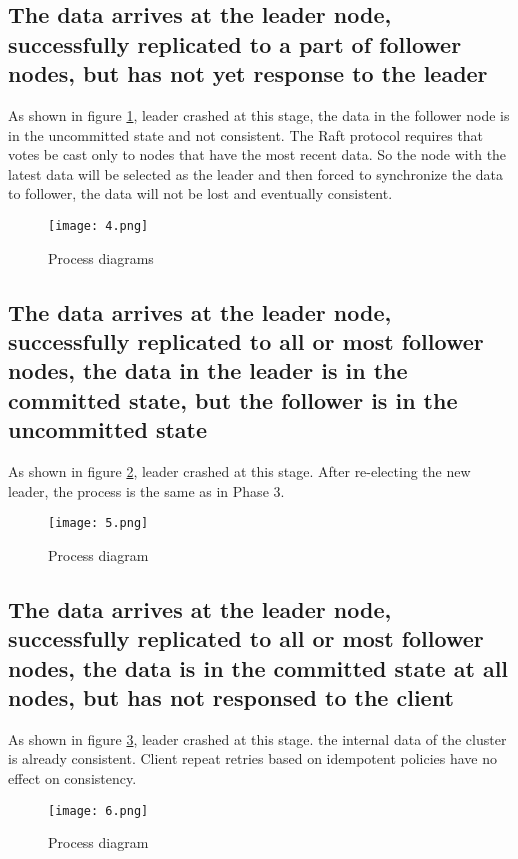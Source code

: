 \documentclass{report}
\begin{document}
\subsection{The data arrives at the leader node, successfully replicated to a part of follower nodes, but has not yet response to the leader}
As shown in figure \ref{fig:4}, leader crashed at this stage, the data in the follower node is in the uncommitted state and not consistent. The Raft protocol requires that votes be cast only to nodes that have the most recent data. So the node with the latest data will be selected as the leader and then forced to synchronize the data to follower, the data will not be lost and eventually consistent.
\begin{figure}[H]
    \centering
    \texttt{[image: 4.png]}
    \caption{Process diagrams}
    \label{fig:4}
\end{figure}

\subsection{The data arrives at the leader node, successfully replicated to all or most follower nodes, the data in the leader is in the committed state, but the follower is in the uncommitted state}
As shown in figure \ref{fig:5}, leader crashed at this stage. After re-electing the new leader, the process is the same as in Phase 3.
\begin{figure}[H]
    \centering
    \texttt{[image: 5.png]}
    \caption{Process diagram}
    \label{fig:5}
\end{figure}

\subsection{The data arrives at the leader node, successfully replicated to all or most follower nodes, the data is in the committed state at all nodes, but has not responsed to the client}
As shown in figure \ref{fig:6}, leader crashed at this stage. the internal data of the cluster is already consistent. Client repeat retries based on idempotent policies have no effect on consistency.
\begin{figure}[H]
    \centering
    \texttt{[image: 6.png]}
    \caption{Process diagram}
    \label{fig:6}
\end{figure}
\end{document}
